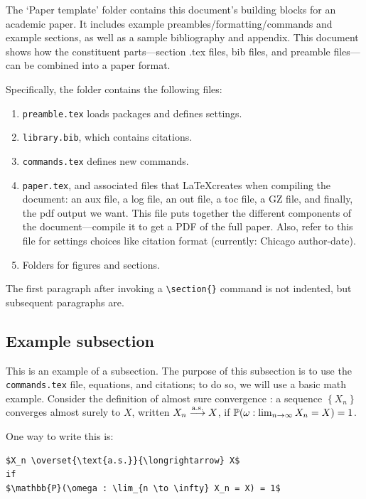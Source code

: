 

The `Paper template' folder contains this document's building blocks for an academic paper. It includes example preambles/formatting/commands and example sections, as well as a sample bibliography and appendix. This document shows how the constituent parts—section .tex files, bib files, and preamble files—can be combined into a paper format. 

Specifically, the folder contains the following files:
\begin{enumerate}
\item \Verb"preamble.tex" loads packages and defines settings.
\item  \Verb"library.bib", which contains citations.
\item \Verb"commands.tex" defines new commands. 
\item \Verb"paper.tex", and associated files that \LaTeX creates when compiling the document: an aux file, a log file, an out file, a toc file, a GZ file, and finally, the pdf output we want. This file puts together the different components of the document---compile it to get a PDF of the full paper. Also, refer to this file for settings choices like citation format (currently: Chicago author-date).
\item Folders for figures and sections.
\end{enumerate}

The first paragraph after invoking a \Verb"\section{}" command is not indented, but subsequent paragraphs are.

\subsection {Example subsection}

This is an example of a subsection. The purpose of this subsection is to use the \texttt{commands.tex} file, equations, and citations; to do so, we will use a basic math example. Consider the definition of almost sure convergence \citep{durrett2019probability}: a sequence $\left\{X_n\right\}$ converges almost surely to $X$, written $X_n \overset{\text{a.s.}}{\longrightarrow} X$, if $\mathbb{P}(\omega : \lim_{n \to \infty} X_n = X) = 1$.

One way to write this is:
\begin{verbatim}
$X_n \overset{\text{a.s.}}{\longrightarrow} X$ 
if 
$\mathbb{P}(\omega : \lim_{n \to \infty} X_n = X) = 1$
\end{verbatim}

